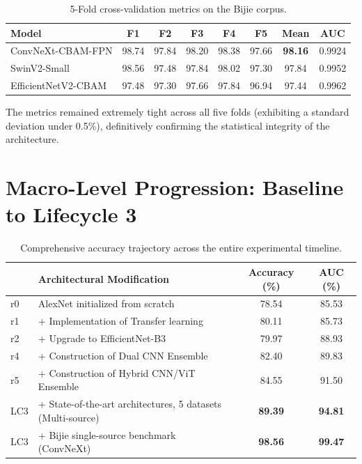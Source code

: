 \documentclass[12pt,a4paper]{report}
\begin{document}
\begin{table}[H]
\begin{center}
\caption{5-Fold cross-validation metrics on the Bijie corpus.}\label{tab:kfold}
\begin{tabular}{lccccccc}
\hline
{\bf Model} & {\bf F1} & {\bf F2} & {\bf F3} & {\bf F4} & {\bf F5} & {\bf Mean} & {\bf AUC} \\
\hline
ConvNeXt-CBAM-FPN & 98.74 & 97.84 & 98.20 & 98.38 & 97.66 & {\bf 98.16} & 0.9924 \\
SwinV2-Small & 98.56 & 97.48 & 97.84 & 98.02 & 97.30 & 97.84 & 0.9952 \\
EfficientNetV2-CBAM & 97.48 & 97.30 & 97.66 & 97.84 & 96.94 & 97.44 & 0.9962 \\
\hline
\end{tabular}
\end{center}
\end{table}

The metrics remained extremely tight across all five folds (exhibiting a standard deviation under 0.5\%), definitively confirming the statistical integrity of the architecture.

\section{Macro-Level Progression: Baseline to Lifecycle 3}

\begin{table}[H]
\begin{center}
\caption{Comprehensive accuracy trajectory across the entire experimental timeline.}\label{tab:evolution}
\begin{tabular}{llcc}
\hline
& {\bf Architectural Modification} & {\bf Accuracy (\%)} & {\bf AUC (\%)} \\
\hline
r0 & AlexNet initialized from scratch & 78.54 & 85.53 \\
r1 & + Implementation of Transfer learning & 80.11 & 85.73 \\
r2 & + Upgrade to EfficientNet-B3 & 79.97 & 88.93 \\
r4 & + Construction of Dual CNN Ensemble & 82.40 & 89.83 \\
r5 & + Construction of Hybrid CNN/ViT Ensemble & 84.55 & 91.50 \\
\hline
LC3 & + State-of-the-art architectures, 5 datasets (Multi-source) & {\bf 89.39} & {\bf 94.81} \\
LC3 & + Bijie single-source benchmark (ConvNeXt) & {\bf 98.56} & {\bf 99.47} \\
\hline
\end{tabular}
\end{center}
\end{table}
\end{document}
